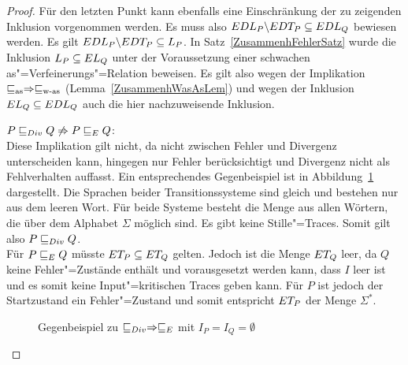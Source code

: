 \begin{proof}
  Für den letzten Punkt kann ebenfalls eine Einschränkung der zu zeigenden
  Inklusion vorgenommen werden. Es muss also $EDL _P \backslash EDT _P
  \subseteq EDL _Q$ bewiesen werden. Es gilt $EDL _P\backslash EDT _P
  \subseteq L _P$. In Satz~\ref{ZusammenhFehlerSatz} wurde die Inklusion
  $L _P\subseteq EL _Q$ unter der Voraussetzung einer schwachen
  as"=Verfeinerungs"=Relation beweisen. Es gilt also wegen der Implikation
  $\sqsubseteq _{\mathrm{as}} \Rightarrow \sqsubseteq _{\mathrm{w}\text{-}\mathrm{as}}$ (Lemma~\ref{ZusammenhWasAsLem}) und wegen der
  Inklusion $EL _Q \subseteq EDL _Q$ auch die hier nachzuweisende
  Inklusion.

  $P  \sqsubseteq  _{Div} Q \not\Rightarrow P  \sqsubseteq  _E Q$:\\
  Diese Implikation gilt nicht, da \DRel{} nicht zwischen Fehler und Divergenz
  unterscheiden kann, \ERel{} hingegen nur Fehler berücksichtigt und Divergenz
  nicht als Fehlverhalten auffasst. Ein entsprechendes Gegenbeispiel ist in
  Abbildung~\ref{DivEGegenBsp} dargestellt. Die Sprachen beider
  Transitionssysteme sind gleich und bestehen nur aus dem leeren Wort. Für
  beide Systeme besteht die Menge \EDT{} aus allen Wörtern, die über dem
  Alphabet $\Sigma$ möglich sind. Es gibt keine Stille"=Traces. Somit gilt also
  $P  \sqsubseteq  _{Div} Q$.\\
  Für $P  \sqsubseteq  _E Q$ müsste $ET _P \subseteq ET _Q$ gelten. Jedoch ist die Menge
  $ET _Q$ leer, da $Q$ keine Fehler"=Zustände enthält und vorausgesetzt werden
  kann, dass $I$ leer ist und es somit keine Input"=kritischen Traces geben
  kann. Für $P$ ist jedoch der Startzustand ein Fehler"=Zustand und somit
  entspricht $ET _P$ der Menge $\Sigma ^*$.

  \begin{figure}[htbp]
    \begin{center}
      \caption{Gegenbeispiel zu $ \sqsubseteq  _{Div} \Rightarrow  \sqsubseteq  _E$ mit $I_P = I_Q =
      \emptyset$}
      \label{DivEGegenBsp}
    \end{center}
  \end{figure}


\end{proof}

